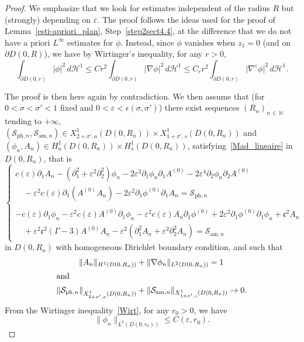 \documentclass[AHL,Unicode,longabstracts,published]{cedram}
\newcommand*\p{\partial}
\newcommand*\N{\mathbb N}
\newcommand{\amm}{\mathrm{am}}
\newcommand{\phl}{\mathrm{ph}}
\newcommand*\BH{\mathcal{H}}
\newcommand*\BS{\mathcal{S}}
\newcommand*\cs{{\mathfrak c}}
\newcommand*\ii{\infty}
\newcommand*\ls{\leqslant }
\newcommand*\e{\varepsilon}
\newcommand*\ep{\epsilon}
\newcommand*\s{\sigma}
\begin{document}
\begin{proof}
We emphasize that we look for estimates independent of the radius $ R $ but (strongly) depending on $ \e $. The proof follows the ideas used for the proof of Lemma~\ref{esti-apriori_plan}, Step~\ref{step2sect4.4}, at the difference that we do not have a priori $ L^\ii $ estimates for $ \phi $. Instead, since $ \phi $ vanishes when $ z_1 = 0 $ (and on $ \p D(0, R) $), we have by Wirtinger's inequality, for any $ r > 0 $,
\begin{equation}\label{Wirt}
\int_{ \p D(0,r) } \lvert \phi \rvert^2 \, d \BH^1
\ls C r^2 \int_{ \p D(0,r) } \lvert \nabla \phi \rvert^2 \, d \BH^1
\ls C_\e r^2 \int_{ \p D(0,r) } \lvert \nabla^\e \phi \rvert^2 \, d \BH^1.
\end{equation}

The proof is then here again by contradiction. We then assume that (for $ 0 < \s < \s' <1 $ fixed and $ 0 < \e < \ep(\s, \s') $) there exist sequences $ (R_n)_{n\,\in\,\N} $ tending to $ + \ii $, $ (\BS_{{\phl},n}, \BS_{{\amm},n}) \in X^1_{2+\s',a} (D(0,R_n)) \times X^1_{1+ \s',s } (D(0,R_n)) $ and $ (\phi_n, A_n) \in H^1_{a } (D(0,R_n)) \times H^1_{s } (D(0,R_n))$, satisfying~\eqref{Mad_lineaire} in $ D(0,R_n)$, that is
\begin{equation}\label{syst_abs_disk}
\left\{
\begin{array}{ll}
c(\e) \p_{1} A_n - \left(\p_{1}^2 + \e^2 \p^2_{2}\right) \phi_n - 2 \e^2 \p_{1} \phi_n \p_{1} A^{(0)} - 2 \e^4 \p_{2} \phi_n \p_{2} A^{(0)}
\\
\quad - \e^2 c(\e) \p_1 \left(A^{(0)} A_n\right) - 2 \e^2 \p_{1} \phi^{(0)} \p_{1} A_n = \BS_{{\phl},n} \\ \ \\
- c(\e) \p_{1} \phi_n - \e^2 c(\e) A^{(0)} \p_1 \phi_n - \e^2 c(\e) A_n \p_1 \phi^{(0)} + 2 \e^2 \p_{1} \phi^{(0)} \p_{1} \phi_n + \cs^2 A_n
\\
\quad + \e^2 \cs^2 (\Gamma -3) A^{(0)} A_n - \e^2 \left(\p_{1}^2 A_n + \e^2 \p_{2}^2 A_n\right) = \BS_{{\amm},n}
\end{array}\right.
\end{equation}
in $ D(0,R_n) $ with homogeneous Dirichlet boundary condition, and such that
\begin{align}
\| A_n \|_{ H^1 (D(0,R_n))} &+ \| \nabla \phi_n \|_{ L^2 (D(0,R_n))} = 1\label{hypoth1_disk}
\\
\intertext{and}
\left\| \BS_{{\phl},n} \right\|_{ X^1_{2+\s', a} (D(0,R_n))} &+ \| \BS_{{\amm},n} \|_{ X^1_{1+\s', s} (D(0,R_n))}
\to 0.\label{hypoth2_disk}
\end{align}
From the Wirtinger inequality~\eqref{Wirt}, for any $ r_0 > 0 $, we have
\[
\| \phi_n \|_{L^2 (D(0,r_0))} \ls C (\e, r_0).
\]


\end{proof}
\end{document}
